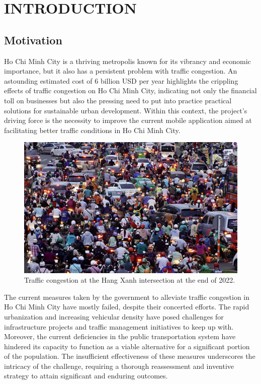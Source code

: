 %
%
\section{INTRODUCTION}

\subsection{Motivation}

Ho Chi Minh City is a thriving metropolis known for its vibrancy and economic importance, but it also has a persistent problem with traffic congestion. An astounding estimated cost of 6 billion USD per year \cite{congestion-damage} highlights the crippling effects of traffic congestion on Ho Chi Minh City, indicating not only the financial toll on businesses but also the pressing need to put into practice practical solutions for sustainable urban development. Within this context, the project's driving force is the necessity to improve the current mobile application aimed at facilitating better traffic conditions in Ho Chi Minh City. \cite{utraffic-mobile}

\begin{figure}[H]
    \includegraphics[width=\textwidth]{assets/images/Trivia/Ket_xe.jpg}
    \caption{Traffic congestion at the Hang Xanh intersection at the end of 2022.}
    \label{fig:ket_xe}
\end{figure}

The current measures taken by the government to alleviate traffic congestion in Ho Chi Minh City have mostly failed, despite their concerted efforts. The rapid urbanization and increasing vehicular density have posed challenges for infrastructure projects and traffic management initiatives to keep up with. Moreover, the current deficiencies in the public transportation system have hindered its capacity to function as a viable alternative for a significant portion of the population. The insufficient effectiveness of these measures underscores the intricacy of the challenge, requiring a thorough reassessment and inventive strategy to attain significant and enduring outcomes.

